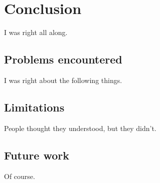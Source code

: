 \chapter{Conclusion}
\label{chap:Conclusion}

I was right all along.

\section{Problems encountered}

I was right about the following things.

\section{Limitations}

People thought they understood, but they didn't.

\section{Future work}

Of course.